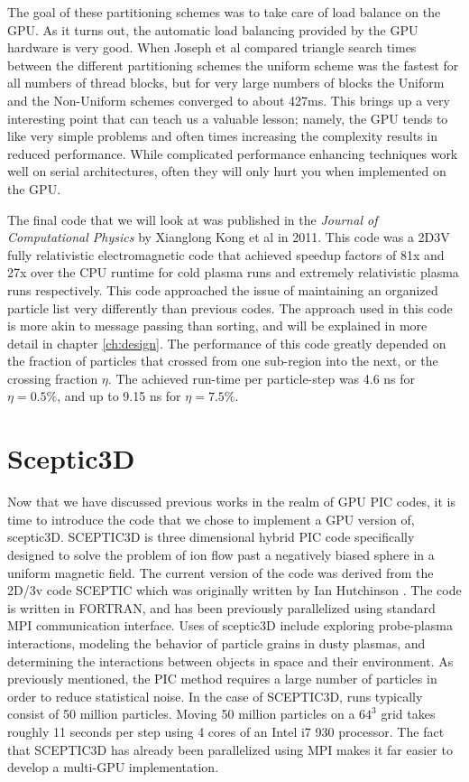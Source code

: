 The goal of these partitioning schemes was to take care of load balance on the GPU. As it turns out, the automatic load balancing provided by the GPU hardware is very good. When Joseph et al compared triangle search times between the different partitioning schemes the uniform scheme was the fastest for all numbers of thread blocks, but for very large numbers of blocks the Uniform and the Non-Uniform schemes converged to about 427ms. This brings up a very interesting point that can teach us a valuable lesson; namely, the GPU tends to like very simple problems and often times increasing the complexity results in reduced performance. While complicated performance enhancing techniques work well on serial architectures, often they will only hurt you when implemented on the GPU. 

The final code that we will look at was published in the \emph{Journal of Computational Physics} by Xianglong Kong et al in 2011. This code was a 2D3V fully relativistic electromagnetic code that achieved speedup factors of 81x and 27x over the CPU runtime for cold plasma runs and extremely relativistic plasma runs respectively. This code approached the issue of maintaining an organized particle list very differently than previous codes. The approach used in this code is more akin to message passing than sorting, and will be explained in more detail in chapter \ref{ch:design}. The performance of this code greatly depended on the fraction of particles that crossed from one sub-region into the next, or the crossing fraction $\eta$. The achieved run-time per particle-step was 4.6 ns for $\eta=0.5\%$, and up to 9.15 ns for $\eta=7.5\%$. \cite{Kong2011}

		

	\section{Sceptic3D}
Now that we have discussed previous works in the realm of GPU PIC codes, it is time to introduce the code that we chose to implement a GPU version of, sceptic3D. SCEPTIC3D is three dimensional hybrid PIC code specifically designed to solve the problem of ion flow past a negatively biased sphere in a uniform magnetic field. The current version of the code was derived from the 2D/3v code SCEPTIC which was originally written by Ian Hutchinson \cite{Hutchinson2002,Hutchinson2003,Hutchinson2005,Hutchinson2006}. The code is written in FORTRAN, and has been previously parallelized using standard MPI communication interface. Uses of sceptic3D include exploring probe-plasma interactions, modeling the behavior of particle grains in dusty plasmas, and determining the interactions between objects in space and their environment. As previously mentioned, the PIC method requires a large number of particles in order to reduce statistical noise. In the case of SCEPTIC3D, runs typically consist of 50 million particles.
Moving 50 million particles on a $64^3$ grid takes roughly 11 seconds per step using 4 cores of an Intel i7 930 processor. The fact that SCEPTIC3D has already been parallelized using MPI makes it far easier to develop a multi-GPU implementation. 

